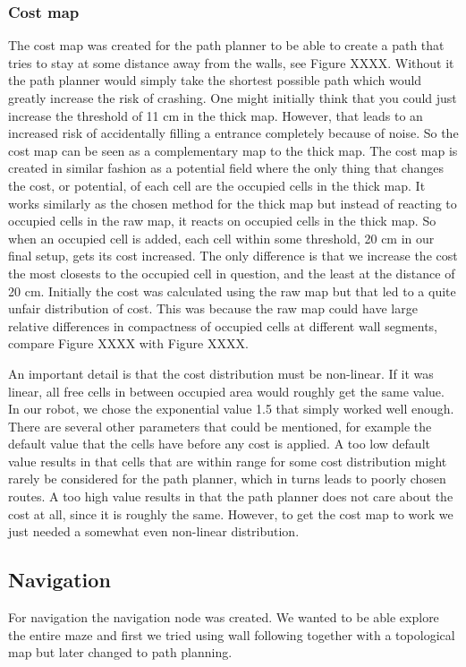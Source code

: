 \subsubsection{Cost map}
The cost map was created for the path planner to be able to create a path that tries to stay at some distance away from the walls, see Figure XXXX. Without it the path planner would simply take the shortest possible path which would greatly increase the risk of crashing. One might initially think that you could just increase the threshold of 11 cm in the thick map. However, that leads to an increased risk of accidentally filling a entrance completely because of noise. So the cost map can be seen as a complementary map to the thick map. The cost map is created in similar fashion as a potential field where the only thing that changes the cost, or potential, of each cell are the occupied cells in the thick map. It works similarly as the chosen method for the thick map but instead of reacting to occupied cells in the raw map, it reacts on occupied cells in the thick map. So when an occupied cell is added, each cell within some threshold, 20 cm in our final setup, gets its cost increased. The only difference is that we increase the cost the most closests to the occupied cell in question, and the least at the distance of 20 cm. Initially the cost was calculated using the raw map but that led to a quite unfair distribution of cost. This was because the raw map could have large relative differences in compactness of occupied cells at different wall segments, compare Figure XXXX with Figure XXXX. 

An important detail is that the cost distribution must be non-linear. If it was linear, all free cells in between occupied area would roughly get the same value. In our robot, we chose the exponential value 1.5 that simply worked well enough. There are several other parameters that could be mentioned, for example the default value that the cells have before any cost is applied. A too low default value results in that cells that are within range for some cost distribution might rarely be considered for the path planner, which in turns leads to poorly chosen routes. A too high value results in that the path planner does not care about the cost at all, since it is roughly the same. However, to get the cost map to work we just needed a somewhat even non-linear distribution. 


\subsection{Navigation}
For navigation the navigation node was created. We wanted to be able explore the entire maze and first we tried using wall following together with a topological map but later changed to path planning. 

